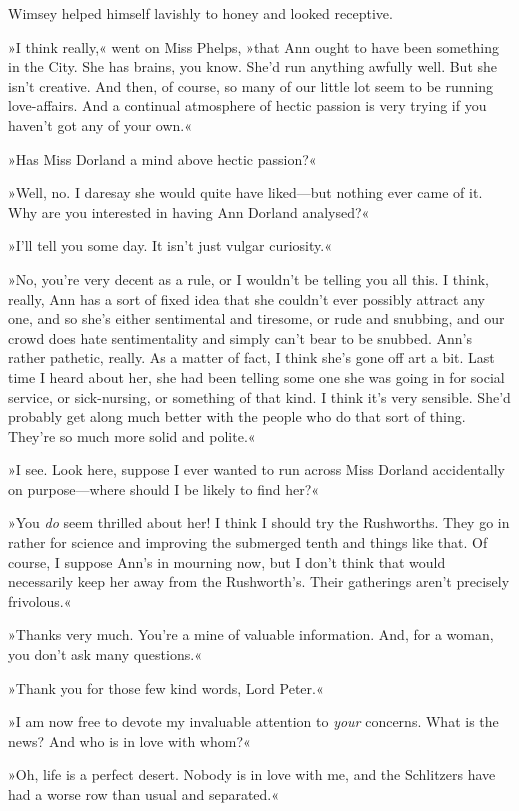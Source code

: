 Wimsey helped himself lavishly to honey and looked receptive.

»I think really,« went on Miss Phelps, »that Ann ought to have been something in the City. She has brains, you know. She'd run anything awfully well. But she isn't creative. And then, of course, so many of our little lot seem to be running love-affairs. And a continual atmosphere of hectic passion is very trying if you haven't got any of your own.«

»Has Miss Dorland a mind above hectic passion?«

»Well, no. I daresay she would quite have liked—but nothing ever came of it. Why are you interested in having Ann Dorland analysed?«

»I'll tell you some day. It isn't just vulgar curiosity.«

»No, you're very decent as a rule, or I wouldn't be telling you all this. I think, really, Ann has a sort of fixed idea that she couldn't ever possibly attract any one, and so she's either sentimental and tiresome, or rude and snubbing, and our crowd does hate sentimentality and simply can't bear to be snubbed. Ann's rather pathetic, really. As a matter of fact, I think she's gone off art a bit. Last time I heard about her, she had been telling some one she was going in for social service, or sick-nursing, or something of that kind. I think it's very sensible. She'd probably get along much better with the people who do that sort of thing. They're so much more solid and polite.«

»I see. Look here, suppose I ever wanted to run across Miss Dorland accidentally on purpose—where should I be likely to find her?«

»You \textit{do} seem thrilled about her! I think I should try the Rushworths. They go in rather for science and improving the submerged tenth and things like that. Of course, I suppose Ann's in mourning now, but I don't think that would necessarily keep her away from the Rushworth's. Their gatherings aren't precisely frivolous.«

»Thanks very much. You're a mine of valuable information. And, for a woman, you don't ask many questions.«

»Thank you for those few kind words, Lord Peter.«

»I am now free to devote my invaluable attention to \textit{your} concerns. What is the news? And who is in love with whom?«

»Oh, life is a perfect desert. Nobody is in love with me, and the Schlitzers have had a worse row than usual and separated.«

